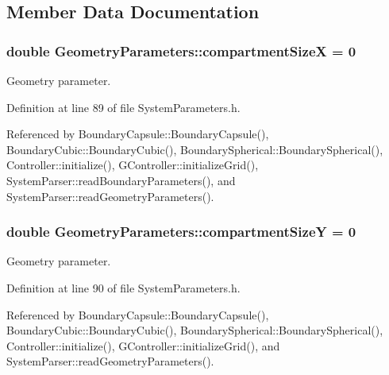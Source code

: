 \subsection{Member Data Documentation}
\hypertarget{structGeometryParameters_a74845fb942433ad543c1cb7ff437da2f}{
\subsubsection[{compartment\+Size\+X}]{\setlength{\rightskip}{0pt plus 5cm}double Geometry\+Parameters\+::compartment\+Size\+X = 0}}\label{structGeometryParameters_a74845fb942433ad543c1cb7ff437da2f}


Geometry parameter. 



Definition at line 89 of file System\+Parameters.\+h.



Referenced by Boundary\+Capsule\+::\+Boundary\+Capsule(), Boundary\+Cubic\+::\+Boundary\+Cubic(), Boundary\+Spherical\+::\+Boundary\+Spherical(), Controller\+::initialize(), G\+Controller\+::initialize\+Grid(), System\+Parser\+::read\+Boundary\+Parameters(), and System\+Parser\+::read\+Geometry\+Parameters().

\hypertarget{structGeometryParameters_a6364473fe0575150e254838e4c91e610}{
\subsubsection[{compartment\+Size\+Y}]{\setlength{\rightskip}{0pt plus 5cm}double Geometry\+Parameters\+::compartment\+Size\+Y = 0}}\label{structGeometryParameters_a6364473fe0575150e254838e4c91e610}


Geometry parameter. 



Definition at line 90 of file System\+Parameters.\+h.



Referenced by Boundary\+Capsule\+::\+Boundary\+Capsule(), Boundary\+Cubic\+::\+Boundary\+Cubic(), Boundary\+Spherical\+::\+Boundary\+Spherical(), Controller\+::initialize(), G\+Controller\+::initialize\+Grid(), and System\+Parser\+::read\+Geometry\+Parameters().

